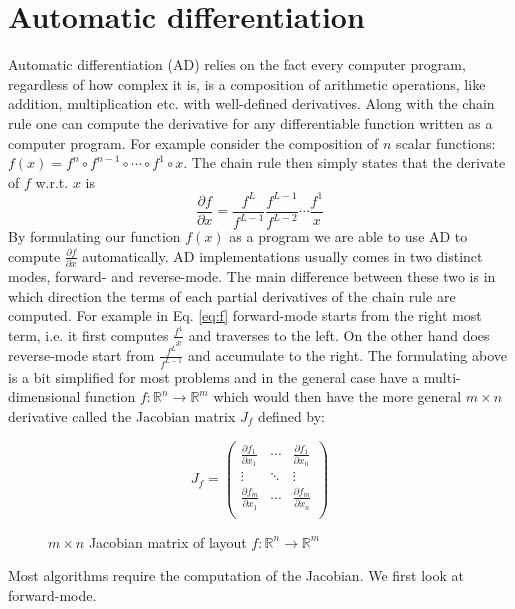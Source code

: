 	\section{Automatic differentiation}
	Automatic differentiation (AD) relies on the fact every computer program,
	regardless of how complex it is,
	is a composition of arithmetic operations, like addition, multiplication etc.
	with well-defined derivatives.
	Along with the chain rule one can compute the derivative for any differentiable
	function written as a computer program.
	For example consider the composition of $n$ scalar functions:
	$f(x) = f^n \circ f^{n-1} \circ \cdots \circ f^1 \circ x$. The chain rule
	then simply states that the derivate of
	$f$ w.r.t. $x$ is
	\begin{equation}
	\frac{\partial f}{\partial x} = \frac{f^L}{f^{L-1}} \frac{f^{L-1}}{f^{L-2}}
	\cdots \frac{f^1}{x}
	\label{eq:f}
	\end{equation}
	By formulating our function $f(x)$ as a program we are able to use AD to compute
	$\frac{\partial f}{\partial x}$ automatically.
	AD implementations usually comes in two distinct modes, forward- and reverse-mode.
	The main difference between these two is in which direction the terms of each
	partial derivatives of the chain rule
	are computed. For example in Eq. \ref{eq:f} forward-mode starts from the right
	most term, i.e. it first computes $\frac{f^1}{x}$
	and traverses to the left. On the other hand does reverse-mode start from
	$\frac{f^L}{f^{L-1}}$ and accumulate to the right. \newline
	The formulating above is a bit simplified for most problems and in the
	general case have a multi-dimensional function $f:\mathbb{R}^n \to \mathbb{R}^m$  which
	would then have the more general $m\times n$ derivative called the Jacobian matrix $J_f$ defined by:
	\begin{figure}[H]
		$$ J_{f} = \left(\begin{matrix}
		\frac{\partial f_1}{\partial x_1} & \cdots & \frac{\partial f_1}{\partial x_n}
		\\
		\vdots & \ddots & \vdots \\
		\frac{\partial f_m}{\partial x_1} & \cdots  &  \frac{\partial f_m}{\partial
			x_n}\\
		\end{matrix}\right) $$
		\caption{$m\times n$ Jacobian matrix of layout $f : \mathbb{R}^n \to
			\mathbb{R}^m$}
	\end{figure}
    Most algorithms require the computation of the Jacobian. We first look at forward-mode.
